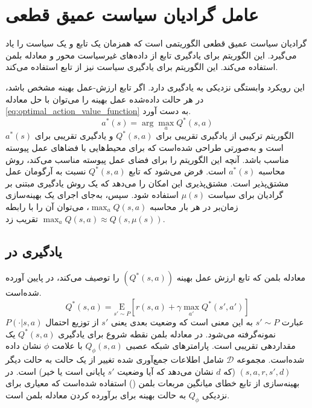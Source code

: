 \section{عامل گرادیان سیاست عمیق قطعی}

گرادیان سیاست عمیق قطعی
الگوریتمی است که همزمان یک تابع  و یک سیاست را یاد می‌گیرد. این الگوريتم برای یادگیری تابع  از داده‌های غیرسیاست محور
 و معادله بلمن استفاده می‌کند. این الگوریتم برای یادگیری سیاست نیز از تابع  استفاده می‌کند.
 
 این رویکرد وابستگی نزدیکی به یادگیری  دارد. اگر تابع ارزش-عمل بهینه 
 مشخص باشد، در هر حالت داده‌شده عمل بهینه
  را می‌توان با حل
 معادله
 \eqref{eq:optimal_action_value_function}
  به دست آورد.
\begin{equation}
	\label{eq:optimal_action_value_function}
	a^*(s) = \arg \max_a Q^*(s,a)
\end{equation}
الگوریتم
ترکیبی از یادگیری تقریبی برای $ Q^*(s,a)$ و یادگیری تقریبی برای
 $a^*(s)$ 
 است و به‌صورتی طراحی شده‌است که برای محیط‌هایی با فضاهای عمل پیوسته مناسب باشد. 
    آنچه این الگوریتم را برای فضای عمل پیوسته مناسب می‌کند، 
       روش محاسبه 
    $a^*(s)$
    است.
    فرض می‌شود که تابع
     $Q^*(s,a)$
      نسبت به آرگومان عمل مشتق‌پذیر است. مشتق‌پذیری این امکان را می‌دهد که یک روش یادگیری مبتنی بر گرادیان برای سیاست
       $\mu(s)$
        استفاده شود. سپس، به‌جای اجرای یک بهینه‌سازی زمان‌بر در هر بار محاسبه
        $\max_a Q(s,a)$،
       می‌توان آن را با رابطه
        \(
        \max_a Q(s,a) \approx Q(s,\mu(s))
        \)
         تقریب زد.
         
         
\subsection{ یادگیری
در 
}
معادله بلمن که تابع ارزش عمل بهینه
 $(Q^*(s,a))$
  را توصیف می‌کند، در پایین آورده شده‌است.
\begin{equation}
	Q^*(s,a) = \underset{s' \sim P}{{\mathrm E}}\left[r(s,a) + \gamma \max_{a'} Q^*(s', a')\right]
\end{equation}
عبارت 
$s' \sim P$ 
به این معنی است که وضعیت بعدی یعنی $s'$ از توزیع احتمال
 $P(\cdot| s,a)$
 نمونه‌گرفته می‌شود.
 در معادله بلمن نقطه شروع برای یادگیری
  $Q^*(s,a)$
 یک مقداردهی تقریبی
   است. پارامترهای شبکه عصبی
    $Q_{\phi}(s,a)$
    با علامت
    $\phi$ 
    نشان داده شده‌است.
    مجموعه
     ${\mathcal D}$
      شامل اطلاعات  جمع‌آوری شده تغییر از یک حالت به حالت دیگر
       $(s,a,r,s',d)$
       (که $d$ نشان می‌دهد که آیا وضعیت $s'$ پایانی است یا خیر) است.
       در بهینه‌سازی از تابع خطای میانگین مربعات بلمن
        () استفاده شده‌است که معیاری برای نزدیکی
         $Q_{\phi}$
         به حالت بهینه
          برای برآورده کردن معادله بلمن است.
          
